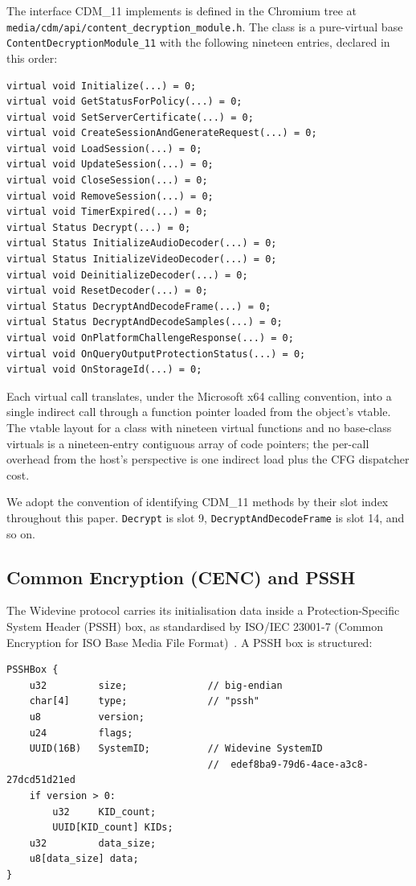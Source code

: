 \documentclass[11pt,letterpaper]{article}
\begin{document}
The interface CDM\_11 implements is defined in the Chromium tree at
\texttt{media/cdm/api/content\_decryption\_module.h}. The class is
a pure-virtual base \texttt{ContentDecryptionModule\_11} with the
following nineteen entries, declared in this order:

\begin{lstlisting}[basicstyle=\ttfamily\scriptsize]
virtual void Initialize(...) = 0;
virtual void GetStatusForPolicy(...) = 0;
virtual void SetServerCertificate(...) = 0;
virtual void CreateSessionAndGenerateRequest(...) = 0;
virtual void LoadSession(...) = 0;
virtual void UpdateSession(...) = 0;
virtual void CloseSession(...) = 0;
virtual void RemoveSession(...) = 0;
virtual void TimerExpired(...) = 0;
virtual Status Decrypt(...) = 0;
virtual Status InitializeAudioDecoder(...) = 0;
virtual Status InitializeVideoDecoder(...) = 0;
virtual void DeinitializeDecoder(...) = 0;
virtual void ResetDecoder(...) = 0;
virtual Status DecryptAndDecodeFrame(...) = 0;
virtual Status DecryptAndDecodeSamples(...) = 0;
virtual void OnPlatformChallengeResponse(...) = 0;
virtual void OnQueryOutputProtectionStatus(...) = 0;
virtual void OnStorageId(...) = 0;
\end{lstlisting}

Each virtual call translates, under the Microsoft x64 calling
convention, into a single indirect call through a function pointer
loaded from the object's vtable. The vtable layout for a class with
nineteen virtual functions and no base-class virtuals is a
nineteen-entry contiguous array of code pointers; the per-call
overhead from the host's perspective is one indirect load plus the
CFG dispatcher cost.

We adopt the convention of identifying CDM\_11 methods by their slot
index throughout this paper. \texttt{Decrypt} is slot 9,
\texttt{DecryptAndDecodeFrame} is slot 14, and so on.

\subsection{Common Encryption (CENC) and PSSH}
\label{sec:bg-cenc}

The Widevine protocol carries its initialisation data inside a
Protection-Specific System Header (PSSH) box, as standardised by
ISO/IEC 23001-7 (Common Encryption for ISO Base Media File
Format)~\cite{iso-cenc, w3c-pssh}. A PSSH box is structured:

\begin{lstlisting}[basicstyle=\ttfamily\scriptsize]
PSSHBox {
    u32         size;              // big-endian
    char[4]     type;              // "pssh"
    u8          version;
    u24         flags;
    UUID(16B)   SystemID;          // Widevine SystemID
                                   //  edef8ba9-79d6-4ace-a3c8-27dcd51d21ed
    if version > 0:
        u32     KID_count;
        UUID[KID_count] KIDs;
    u32         data_size;
    u8[data_size] data;
}
\end{lstlisting}
\end{document}
